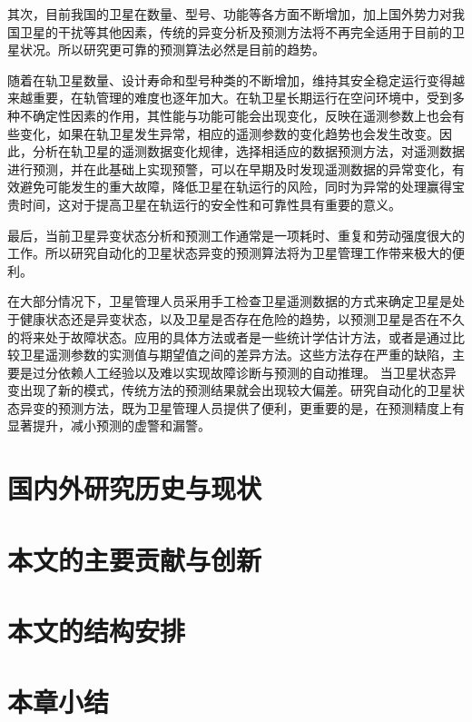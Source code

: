 其次，目前我国的卫星在数量、型号、功能等各方面不断增加，加上国外势力对我国卫星的干扰等其他因素，传统的异变分析及预测方法将不再完全适用于目前的卫星状况。所以研究更可靠的预测算法必然是目前的趋势。

随着在轨卫星数量、设计寿命和型号种类的不断增加，维持其安全稳定运行变得越来越重要，在轨管理的难度也逐年加大。在轨卫星长期运行在空问环境中，受到多种不确定性因素的作用，其性能与功能可能会出现变化，反映在遥测参数上也会有些变化，如果在轨卫星发生异常，相应的遥测参数的变化趋势也会发生改变。因此，分析在轨卫星的遥测数据变化规律，选择相适应的数据预测方法，对遥测数据进行预测，并在此基础上实现预警，可以在早期及时发现遥测数据的异常变化，有效避免可能发生的重大故障，降低卫星在轨运行的风险，同时为异常的处理赢得宝贵时间，这对于提高卫星在轨运行的安全性和可靠性具有重要的意义。

最后，当前卫星异变状态分析和预测工作通常是一项耗时、重复和劳动强度很大的工作。所以研究自动化的卫星状态异变的预测算法将为卫星管理工作带来极大的便利。

在大部分情况下，卫星管理人员采用手工检查卫星遥测数据的方式来确定卫星是处于健康状态还是异变状态，以及卫星是否存在危险的趋势，以预测卫星是否在不久的将来处于故障状态。应用的具体方法或者是一些统计学估计方法，或者是通过比较卫星遥测参数的实测值与期望值之间的差异方法。这些方法存在严重的缺陷，主要是过分依赖人工经验以及难以实现故障诊断与预测的自动推理。
当卫星状态异变出现了新的模式，传统方法的预测结果就会出现较大偏差。研究自动化的卫星状态异变的预测方法，既为卫星管理人员提供了便利，更重要的是，在预测精度上有显著提升，减小预测的虚警和漏警。 

\section{国内外研究历史与现状}


\section{本文的主要贡献与创新}


\section{本文的结构安排}


\section{本章小结}